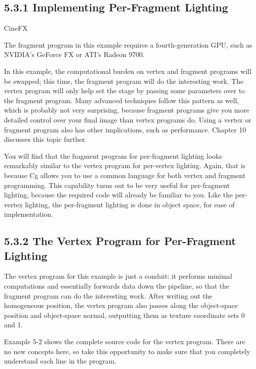 \documentclass[../main.tex]{subfiles}
\begin{document}
\subsection{5.3.1 Implementing Per-Fragment Lighting}

\begin{framed}
CineFX

The fragment program in this example requires a fourth-generation GPU, such as NVIDIA's GeForce FX or ATI's Radeon 9700.
\end{framed}

In this example, the computational burden on vertex and fragment programs will be swapped; this time, the fragment program will do the interesting work. The vertex program will only help set the stage by passing some parameters over to the fragment program. Many advanced techniques follow this pattern as well, which is probably not very surprising, because fragment programs give you more detailed control over your final image than vertex programs do. Using a vertex or fragment program also has other implications, such as performance. Chapter 10 discusses this topic further.

You will find that the fragment program for per-fragment lighting looks remarkably similar to the vertex program for per-vertex lighting. Again, that is because Cg allows you to use a common language for both vertex and fragment programming. This capability turns out to be very useful for per-fragment lighting, because the required code will already be familiar to you. Like the per-vertex lighting, the per-fragment lighting is done in object space, for ease of implementation.

\subsection{5.3.2 The Vertex Program for Per-Fragment Lighting}

The vertex program for this example is just a conduit: it performs minimal computations and essentially forwards data down the pipeline, so that the fragment program can do the interesting work. After writing out the homogeneous position, the vertex program also passes along the object-space position and object-space normal, outputting them as texture coordinate sets 0 and 1.

Example 5-2 shows the complete source code for the vertex program. There are no new concepts here, so take this opportunity to make sure that you completely understand each line in the program.
\end{document}
